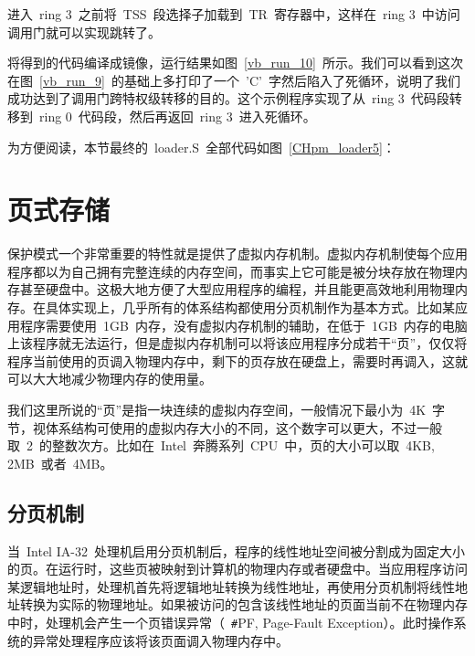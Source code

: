 进入~ring 3~之前将~TSS~段选择子加载到~TR~寄存器中，这样在~ring 3~中访问调用门就可以实现跳转了。

\label{CHpm_tss_load}

将得到的代码编译成镜像，运行结果如图~\ref{vb_run_10}~所示。我们可以看到这次在图~\ref{vb_run_9}~的基础上多打印了一个~'C'~字然后陷入了死循环，说明了我们成功达到了调用门跨特权级转移的目的。这个示例程序实现了从~ring 3~代码段转移到~ring 0~代码段，然后再返回~ring 3~进入死循环。


为方便阅读，本节最终的~loader.S~全部代码如图~\ref{CHpm_loader5}：

\label{CHpm_loader5}

\section{页式存储}

保护模式一个非常重要的特性就是提供了虚拟内存机制。虚拟内存机制使每个应用程序都以为自己拥有完整连续的内存空间，而事实上它可能是被分块存放在物理内存甚至硬盘中。这极大地方便了大型应用程序的编程，并且能更高效地利用物理内存。在具体实现上，几乎所有的体系结构都使用分页机制作为基本方式。比如某应用程序需要使用~1GB~内存，没有虚拟内存机制的辅助，在低于~1GB~内存的电脑上该程序就无法运行，但是虚拟内存机制可以将该应用程序分成若干“页”，仅仅将程序当前使用的页调入物理内存中，剩下的页存放在硬盘上，需要时再调入，这就可以大大地减少物理内存的使用量。

我们这里所说的“页”是指一块连续的虚拟内存空间，一般情况下最小为~4K~字节，视体系结构可使用的虚拟内存大小的不同，这个数字可以更大，不过一般取~2~的整数次方。比如在~Intel~奔腾系列~CPU~中，页的大小可以取~4KB, 2MB~或者~4MB。

\subsection{分页机制}

当~Intel IA-32~处理机启用分页机制后，程序的线性地址空间被分割成为固定大小的页。在运行时，这些页被映射到计算机的物理内存或者硬盘中。当应用程序访问某逻辑地址时，处理机首先将逻辑地址转换为线性地址，再使用分页机制将线性地址转换为实际的物理地址。如果被访问的包含该线性地址的页面当前不在物理内存中时，处理机会产生一个页错误异常（~\texttt{\#}PF, Page-Fault Exception）。此时操作系统的异常处理程序应该将该页面调入物理内存中。

